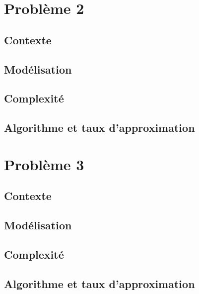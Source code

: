 \documentclass[11pt,french]{report}
\begin{document}
	\chapter{Problème 2}
	\section{Contexte}
	
	\section{Modélisation}
	
	\section{Complexité}
	
	\section{Algorithme et taux d'approximation}
	
	\chapter{Problème 3}
	\section{Contexte}
	
	\section{Modélisation}
	
	\section{Complexité}
	
	\section{Algorithme et taux d'approximation}
	

	
 
	
\end{document}

